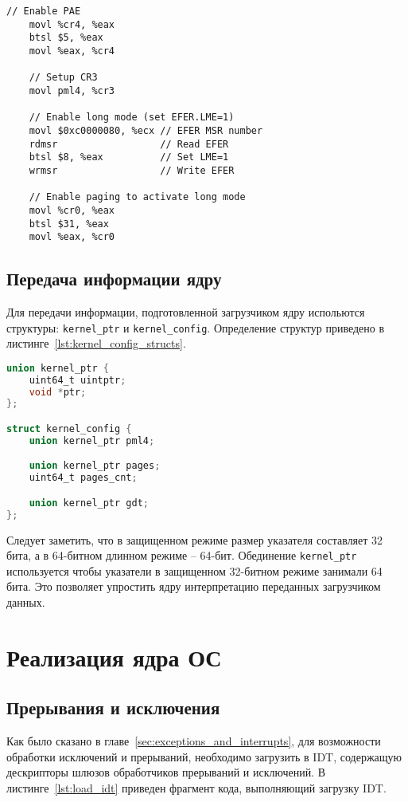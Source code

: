\begin{lstlisting}[language={[x86masm]Assembler},
caption={Переход в длинный режим},label={lst:enter_long_mode}]
	// Enable PAE
	movl %cr4, %eax
	btsl $5, %eax
	movl %eax, %cr4

	// Setup CR3
	movl pml4, %cr3

	// Enable long mode (set EFER.LME=1)
	movl $0xc0000080, %ecx // EFER MSR number
	rdmsr                  // Read EFER
	btsl $8, %eax          // Set LME=1
	wrmsr                  // Write EFER

	// Enable paging to activate long mode
	movl %cr0, %eax
	btsl $31, %eax
	movl %eax, %cr0
\end{lstlisting}

\subsection{Передача информации ядру}
Для передачи информации, подготовленной загрузчиком ядру испольются структуры:
\texttt{kernel\_ptr} и \texttt{kernel\_config}. Определение структур приведено
в листинге~\ref{lst:kernel_config_structs}.

\begin{lstlisting}[language=C,
caption={Структуры для передачи информации ядру},
label={lst:kernel_config_structs}]
union kernel_ptr {
	uint64_t uintptr;
	void *ptr;
};

struct kernel_config {
	union kernel_ptr pml4;

	union kernel_ptr pages;
	uint64_t pages_cnt;

	union kernel_ptr gdt;
};
\end{lstlisting}

Следует заметить, что в защищенном режиме размер указателя составляет 32 бита, а
в 64-битном длинном режиме -- 64-бит. Обединение \texttt{kernel\_ptr} используется
чтобы указатели в защищенном 32-битном режиме занимали 64 бита. Это позволяет
упростить ядру интерпретацию переданных загрузчиком данных.

\section{Реализация ядра ОС}
\subsection{Прерывания и исключения}
Как было сказано в главе~\ref{sec:exceptions_and_interrupts}, для возможности обработки
исключений и прерываний, необходимо загрузить в IDT, содержащую дескрипторы шлюзов
обработчиков прерываний и исключений. В листинге~\ref{lst:load_idt} приведен фрагмент кода,
выполняющий загрузку IDT.


